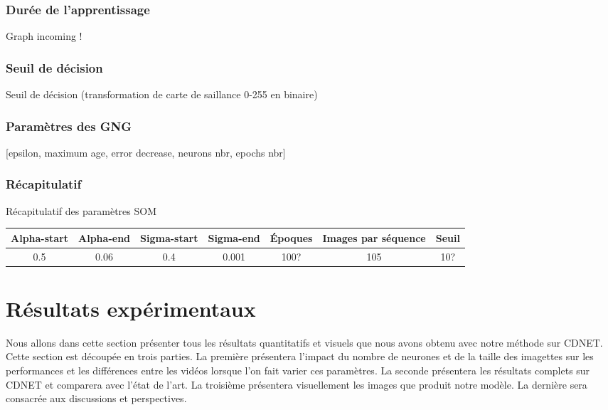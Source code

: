 	\subsubsection{Durée de l'apprentissage}

	Graph incoming !

	\subsubsection{Seuil de décision}

	Seuil de décision (transformation de carte de saillance 0-255 en binaire)

	\subsubsection{Paramètres des GNG}

	[epsilon, maximum age, error decrease, neurons nbr, epochs nbr]

	\subsubsection{Récapitulatif}

	\begin{tableth}
	\label{tab:recap:param}
	\caption[Récapitulatif des paramètres SOM]{Récapitulatif des paramètres SOM}
	\begin{tabular}{|cc|cc|c|c|c|}
		\hline
		Alpha-start	& Alpha-end & Sigma-start & Sigma-end & Époques & Images par séquence & Seuil\\
		\hline
		0.5 & 0.06 & 0.4 & 0.001 & 100? & 105 & 10?\\
		\hline
	\end{tabular}
	\end{tableth}


	\newpage

	\section{Résultats expérimentaux}

	Nous allons dans cette section présenter tous les résultats quantitatifs et visuels que nous avons obtenu avec notre méthode sur CDNET. Cette section est découpée en trois parties. La première présentera l'impact du nombre de neurones et de la taille des imagettes sur les performances et les différences entre les vidéos lorsque l'on fait varier ces paramètres. La seconde présentera les résultats complets sur CDNET et comparera avec l'état de l'art. La troisième présentera visuellement les images que produit notre modèle. La dernière sera consacrée aux discussions et perspectives.

